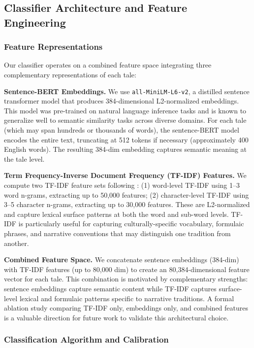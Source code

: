 \documentclass{article}
\begin{document}
\subsection{Classifier Architecture and Feature Engineering}

\subsubsection{Feature Representations}

Our classifier operates on a combined feature space integrating three complementary representations of each tale:

\textbf{Sentence-BERT Embeddings.} We use \texttt{all-MiniLM-L6-v2}, a distilled sentence transformer model \citep{reimers2019} that produces 384-dimensional L2-normalized embeddings. This model was pre-trained on natural language inference tasks and is known to generalize well to semantic similarity tasks across diverse domains. For each tale (which may span hundreds or thousands of words), the sentence-BERT model encodes the entire text, truncating at 512 tokens if necessary (approximately 400 English words). The resulting 384-dim embedding captures semantic meaning at the tale level.

\textbf{Term Frequency-Inverse Document Frequency (TF-IDF) Features.} We compute two TF-IDF feature sets following \citet{salton1988}: (1) word-level TF-IDF using 1--3 word n-grams, extracting up to 50,000 features; (2) character-level TF-IDF using 3--5 character n-grams, extracting up to 30,000 features. These are L2-normalized and capture lexical surface patterns at both the word and sub-word levels. TF-IDF is particularly useful for capturing culturally-specific vocabulary, formulaic phrases, and narrative conventions that may distinguish one tradition from another.

\textbf{Combined Feature Space.} We concatenate sentence embeddings (384-dim) with TF-IDF features (up to 80,000 dim) to create an 80,384-dimensional feature vector for each tale. This combination is motivated by complementary strengths: sentence embeddings capture semantic content while TF-IDF captures surface-level lexical and formulaic patterns specific to narrative traditions. A formal ablation study comparing TF-IDF only, embeddings only, and combined features is a valuable direction for future work to validate this architectural choice.

\subsubsection{Classification Algorithm and Calibration}
\end{document}
